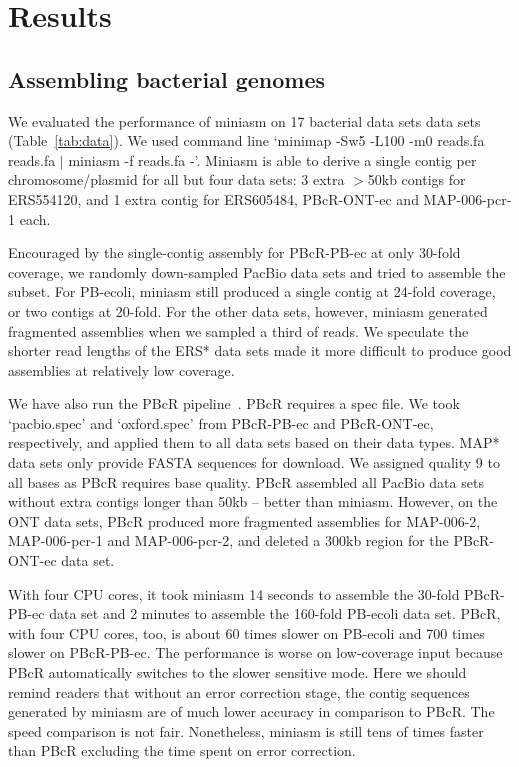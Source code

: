 \documentclass{bioinfo}
\begin{document}
\section{Results}

\subsection{Assembling bacterial genomes}

We evaluated the performance of miniasm on 17 bacterial data sets data sets
(Table~\ref{tab:data}). We used command line `minimap -Sw5 -L100 -m0 reads.fa reads.fa $|$
miniasm -f reads.fa -'. Miniasm is able to derive a single contig per
chromosome/plasmid for all but four data sets: 3 extra $>$50kb contigs for
ERS554120, and 1 extra contig for ERS605484, PBcR-ONT-ec and MAP-006-pcr-1
each. 

Encouraged by the single-contig assembly for PBcR-PB-ec at only 30-fold
coverage, we randomly down-sampled PacBio data sets and tried to assemble the
subset. For PB-ecoli, miniasm still produced a single contig at 24-fold
coverage, or two contigs at 20-fold. For the other data sets, however, miniasm
generated fragmented assemblies when we sampled a third of reads. We speculate
the shorter read lengths of the ERS* data sets made it more difficult to
produce good assemblies at relatively low coverage.

We have also run the PBcR pipeline~\citep{Berlin:2015xy}. PBcR requires a spec
file. We took `pacbio.spec' and `oxford.spec' from PBcR-PB-ec and PBcR-ONT-ec,
respectively, and applied them to all data sets based on their data types. MAP*
data sets only provide FASTA sequences for download. We assigned quality 9 to
all bases as PBcR requires base quality. PBcR assembled all PacBio data sets
without extra contigs longer than 50kb -- better than miniasm. However, on the
ONT data sets, PBcR produced more fragmented assemblies for MAP-006-2,
MAP-006-pcr-1 and MAP-006-pcr-2, and deleted a 300kb region for the PBcR-ONT-ec
data set. 

With four CPU cores, it took miniasm 14 seconds to assemble the 30-fold
PBcR-PB-ec data set and 2 minutes to assemble the 160-fold PB-ecoli data set.
PBcR, with four CPU cores, too, is about 60 times slower on PB-ecoli and 700
times slower on PBcR-PB-ec.  The performance is worse on low-coverage input
because PBcR automatically switches to the slower sensitive mode. Here we
should remind readers that without an error correction stage, the contig
sequences generated by miniasm are of much lower accuracy in comparison to
PBcR. The speed comparison is not fair. Nonetheless, miniasm is still tens of
times faster than PBcR excluding the time spent on error correction.
\end{document}
